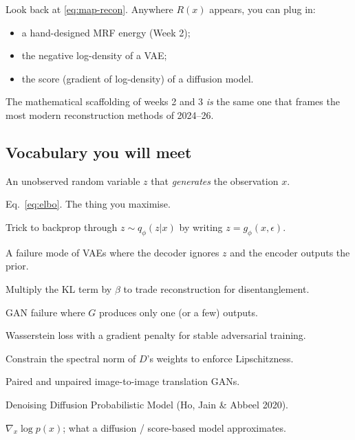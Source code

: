 \documentclass[11pt,a4paper]{article}
\begin{document}
Look back at \eqref{eq:map-recon}. Anywhere $R(x)$ appears, you can
plug in:
\begin{itemize}[leftmargin=*,nosep]
  \item a hand-designed MRF energy (Week 2);
  \item the negative log-density of a VAE;
  \item the score (gradient of log-density) of a diffusion model.
\end{itemize}
The mathematical scaffolding of weeks 2 and 3 \emph{is} the same one
that frames the most modern reconstruction methods of 2024--26.

\subsection{Vocabulary you will meet}

\begin{description}[leftmargin=*]
  \item[\textbf{Latent variable.}] An unobserved random variable $z$
        that \emph{generates} the observation $x$.
  \item[\textbf{ELBO.}] Eq.~\eqref{eq:elbo}. The thing you maximise.
  \item[\textbf{Reparameterisation.}] Trick to backprop through
        $z \sim q_\phi(z|x)$ by writing $z = g_\phi(x, \epsilon)$.
  \item[\textbf{Posterior collapse.}] A failure mode of VAEs where
        the decoder ignores $z$ and the encoder outputs the prior.
  \item[\textbf{$\beta$-VAE.}] Multiply the KL term by $\beta$ to
        trade reconstruction for disentanglement.
  \item[\textbf{Mode collapse.}] GAN failure where $G$ produces
        only one (or a few) outputs.
  \item[\textbf{WGAN-GP.}] Wasserstein loss with a gradient penalty
        for stable adversarial training.
  \item[\textbf{Spectral normalisation.}] Constrain the spectral
        norm of $D$'s weights to enforce Lipschitzness.
  \item[\textbf{Pix2pix / CycleGAN.}] Paired and unpaired
        image-to-image translation GANs.
  \item[\textbf{DDPM.}] Denoising Diffusion Probabilistic Model
        (Ho, Jain \& Abbeel 2020).
  \item[\textbf{Score function.}] $\nabla_x \log p(x)$; what a
        diffusion / score-based model approximates.
\end{description}
\end{document}
